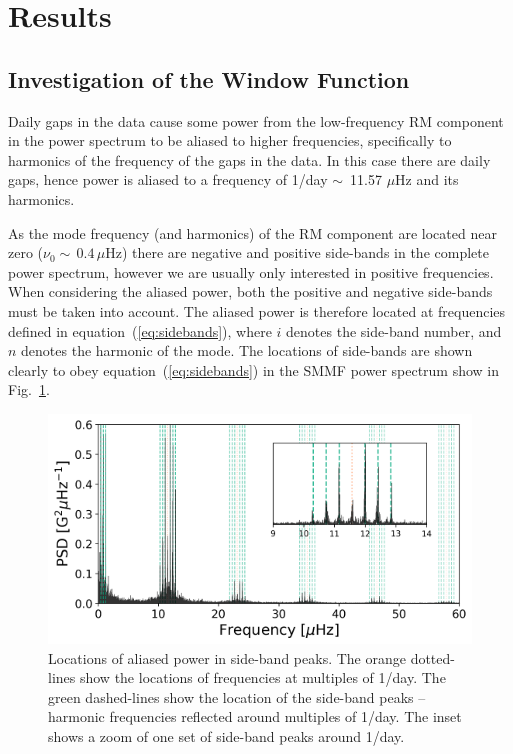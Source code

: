 \section{Results}\label{sec:SMMF_reults}

\subsection{Investigation of the Window Function}\label{sec:window_fn}


Daily gaps in the data cause some power from the low-frequency RM component in the power spectrum to be aliased to higher frequencies, specifically to harmonics of the frequency of the gaps in the data. In this case there are daily gaps, hence power is aliased to a frequency of 1/day $\sim$~11.57 $\mu$Hz and its harmonics.

As the mode frequency (and harmonics) of the RM component are located near zero ($\nu_0 \sim \,0.4 \, \mu\mathrm{Hz}$) there are negative and positive side-bands in the complete power spectrum, however we are usually only interested in positive frequencies. When considering the aliased power, both the positive and negative side-bands must be taken into account. The aliased power is therefore located at frequencies defined in equation~(\ref{eq:sidebands}), where $i$ denotes the side-band number, and $n$ denotes the harmonic of the mode. The locations of side-bands are shown clearly to obey equation~(\ref{eq:sidebands}) in the SMMF power spectrum show in Fig.~\ref{fig:sideband_locations}.

\begin{figure}[ht!]
	\centering
	\includegraphics[width=\columnwidth]{sideband_rescaled.pdf}
	\caption{Locations of aliased power in side-band peaks. The orange dotted-lines show the locations of frequencies at multiples of 1/day. The green dashed-lines show the location of the side-band peaks -- harmonic frequencies reflected around multiples of 1/day.  The inset shows a zoom of one set of side-band peaks around 1/day.}
	\label{fig:sideband_locations}
\end{figure}


